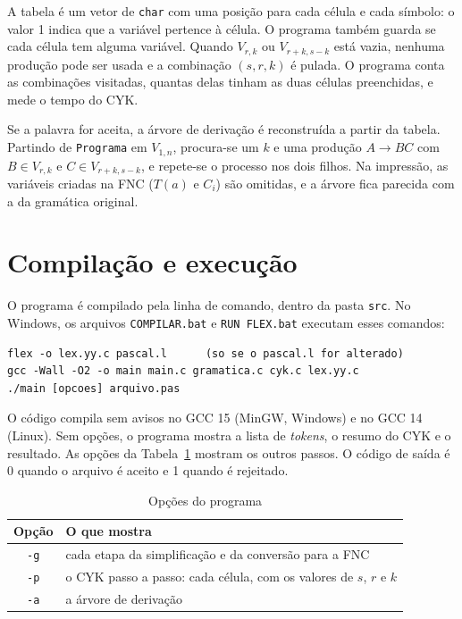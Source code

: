 \documentclass[12pt,a4paper]{article}
\newcommand{\fonte}[1][Elaborado pelos autores (2026).]{%
  \par\vspace{3pt}{\footnotesize Fonte: #1}\par}
\newcommand{\code}[1]{\texttt{#1}}
\begin{document}
A tabela é um vetor de \code{char} com uma posição para cada célula e cada símbolo: o valor 1
indica que a variável pertence à célula. O programa também guarda se cada célula tem alguma
variável. Quando $V_{r,k}$ ou $V_{r+k,s-k}$ está vazia, nenhuma produção pode ser usada e a
combinação $(s, r, k)$ é pulada. O programa conta as combinações visitadas, quantas delas
tinham as duas células preenchidas, e mede o tempo do CYK.

Se a palavra for aceita, a árvore de derivação é reconstruída a partir da tabela. Partindo de
\code{Programa} em $V_{1,n}$, procura-se um $k$ e uma produção $A \to BC$ com $B \in V_{r,k}$ e
$C \in V_{r+k,s-k}$, e repete-se o processo nos dois filhos. Na impressão, as variáveis criadas
na FNC ($T(a)$ e $C_i$) são omitidas, e a árvore fica parecida com a da gramática original.

\section{Compilação e execução}

O programa é compilado pela linha de comando, dentro da pasta \code{src}. No Windows, os
arquivos \code{COMPILAR.bat} e \code{RUN FLEX.bat} executam esses comandos:

\begin{lstlisting}[frame=none]
flex -o lex.yy.c pascal.l      (so se o pascal.l for alterado)
gcc -Wall -O2 -o main main.c gramatica.c cyk.c lex.yy.c
./main [opcoes] arquivo.pas
\end{lstlisting}

O código compila sem avisos no GCC 15 (MinGW, Windows) e no GCC 14 (Linux). Sem opções, o
programa mostra a lista de \textit{tokens}, o resumo do CYK e o resultado. As opções da
Tabela~\ref{t:opcoes} mostram os outros passos. O código de saída é 0 quando o arquivo é aceito
e 1 quando é rejeitado.

\begin{table}[H]
\caption{Opções do programa}\label{t:opcoes}
\centering
\begin{tabular}{@{}cl@{}}
\toprule
Opção & O que mostra \\
\midrule
\code{-g} & cada etapa da simplificação e da conversão para a FNC \\
\code{-p} & o CYK passo a passo: cada célula, com os valores de $s$, $r$ e $k$ \\
\code{-a} & a árvore de derivação \\
\bottomrule
\end{tabular}
\fonte
\end{table}
\end{document}
